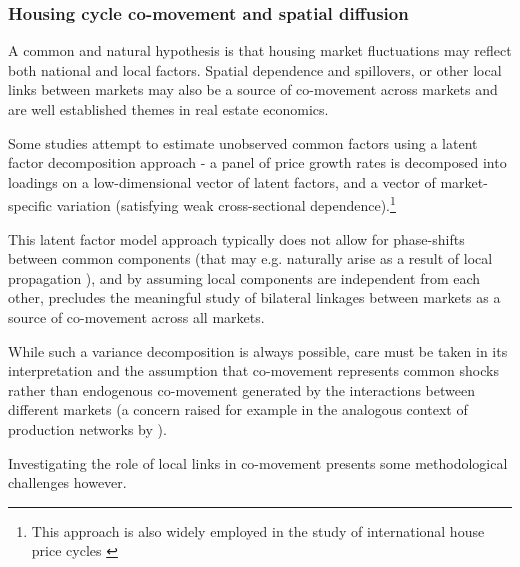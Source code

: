 \documentclass[11pt]{article}
\begin{document}


\subsubsection{Housing cycle co-movement and spatial diffusion}

A common and natural hypothesis is that housing market fluctuations may reflect both national and local factors. Spatial dependence and spillovers, or other local links between markets may also be a source of co-movement across markets and are well established themes in real estate economics. 

Some studies attempt to estimate unobserved common factors using a latent factor decomposition approach \citep{DelNegro2007} - a panel of price growth rates is decomposed into loadings on a low-dimensional vector of latent factors, and a vector of market-specific variation (satisfying weak cross-sectional dependence).\footnote{This approach is also widely employed in the study of international house price cycles \cite{}} %

This latent factor model approach typically does not allow for phase-shifts between common components (that may e.g. naturally arise as a result of local propagation%
), and by assuming local components are independent from each other, precludes the meaningful study of bilateral linkages between markets as a source of co-movement across all markets.


While such a variance decomposition is always possible, care must be taken in its interpretation and the assumption that co-movement represents common shocks rather than endogenous co-movement generated by the interactions between different markets (a concern raised for example in the analogous context of production networks by \cite{Carvalho2019b}).

Investigating the role of local links in co-movement presents some methodological challenges however. 
\end{document}
